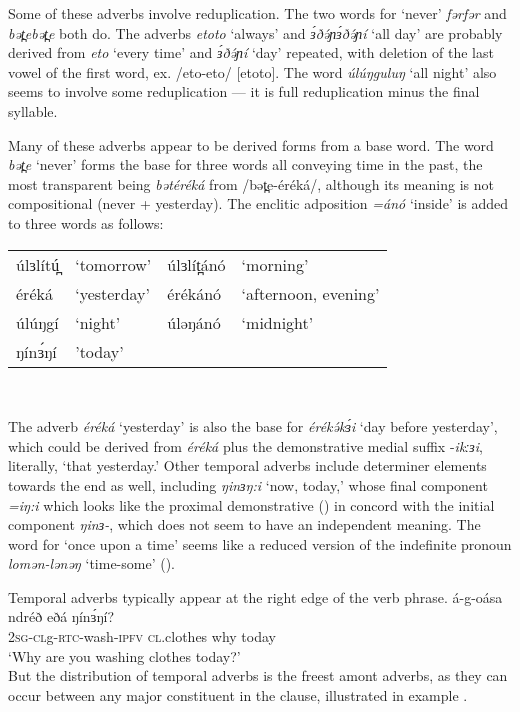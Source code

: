 \z 
Some of these adverbs involve reduplication. The two words for ‘never’ \textit{fərfər} and \textit{bət̪ebət̪e} both do. The adverbs \textit{etoto} ‘always’ and \textit{ɜ́ðə́ɲɜ́ðə́ɲí} ‘all day’ are probably derived from \textit{eto} ‘every time’ and \textit{ɜ́ðə́ɲí} ‘day’ repeated, with deletion of the last vowel of the first word, ex. /eto-eto/  [etoto]. The word \textit{úlúŋguluŋ} ‘all night’ also seems to involve some reduplication --- it is full reduplication minus the final syllable.


Many of these adverbs appear to be derived forms from a base word. The word \textit{bət̪e} ‘never’ forms the base for three words all conveying time in the past, the most transparent being \textit{bətéréká} from /bət̪e-éréká/, although its meaning is not compositional (never + yesterday). The enclitic adposition \textit{=ánó} `inside' is added to three words as follows:

\ea \begin{tabular}[t]{llll}
úlɜlítú̪ &	‘tomorrow’ 	&	úlɜlít̪ánó 	&	‘morning’ \\
éréká 	&	‘yesterday’ 	&	érékánó 		&	‘afternoon, evening’ \\
úlúŋgí	&	‘night’		&	úləŋánó		&	‘midnight’\\
ŋínɜ́ŋí	&	'today'\\
\end{tabular}\\
\z

The adverb \textit{éréká} `yesterday' is also the base for \textit{érékə́kɜ́i} ‘day before yesterday’, which could be derived from \textit{éréká} plus the demonstrative medial suffix -\textit{ikːɜi}, literally, `that yesterday.' Other temporal adverbs include determiner elements towards the end as well, including \textit{ŋinɜŋ:i} `now, today,' whose final component \textit{=iŋ:i} which looks like the proximal demonstrative () in concord with the initial component \textit{ŋinɜ-}, which does not seem to have an independent meaning. The word for `once upon a time' seems like a reduced version of the indefinite pronoun \textit{lomən-lənəŋ} `time-some' ().

Temporal adverbs typically appear at the right edge of the verb phrase.
\ea \gll á-g-oása  ndréð   eðá    ŋínɜ́ŋí?\\
2\textsc{sg-cl}g-\textsc{rtc}-wash-\textsc{ipfv}  \textsc{cl}.clothes  why  today\\
\glt `Why are you washing clothes today?'\\
\z 
But the distribution of temporal adverbs is the freest amont adverbs, as they can occur between any major constituent in the clause, illustrated in example .

